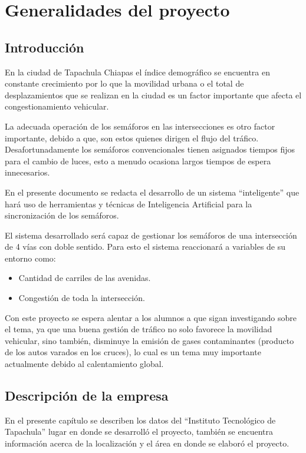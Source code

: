 \chapter{Generalidades del proyecto}

\section{Introducción}

En la ciudad de Tapachula Chiapas el índice demográfico se encuentra en constante crecimiento por lo que la movilidad urbana o el total de desplazamientos que se realizan en la ciudad es un factor importante que afecta el congestionamiento vehicular.

La adecuada operación de los semáforos en las intersecciones es otro factor importante, debido a que, son estos quienes dirigen el flujo del tráfico. Desafortunadamente los semáforos convencionales tienen asignados tiempos fijos para el cambio de luces, esto a menudo ocasiona largos tiempos de espera innecesarios.  

En el presente documento se redacta el desarrollo de un sistema “inteligente” que hará uso de herramientas y técnicas de Inteligencia Artificial para la sincronización de los semáforos.

El sistema desarrollado será capaz de gestionar los semáforos de una intersección de 4 vías con doble sentido. Para esto el sistema reaccionará a variables de su entorno como:

{\setlength{\baselineskip}{0.7\baselineskip}
\begin{itemize}
	\item Cantidad de carriles de las avenidas.
	\item Congestión de toda la intersección.
\end{itemize}}

Con este proyecto se espera alentar a los alumnos a que sigan investigando sobre el tema, ya que una buena gestión de tráfico no solo favorece la movilidad vehicular, sino también, disminuye la emisión de gases contaminantes (producto de los autos varados en los cruces), lo cual es un tema muy importante actualmente debido al calentamiento global.

\section{Descripción de la empresa}

En el presente capítulo se describen los datos del “Instituto Tecnológico de Tapachula” lugar en donde se desarrolló el proyecto, también se encuentra información acerca de la localización y el área en donde se elaboró el proyecto.

